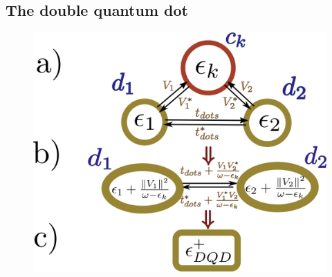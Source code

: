 \documentclass[showpacs,aps,prb,reprint,superscriptaddress]{revtex4-1}
\begin{document}
\subsection{The double quantum dot}


        \begin{figure}[t]
        \begin{center}
        \includegraphics[scale=0.25]{Graficos/Graph_DQD-Pro.png}
        \caption{ 
        }
        \label{fig:GraphsDQD}
        \end{center}
        \end{figure}
\end{document}
